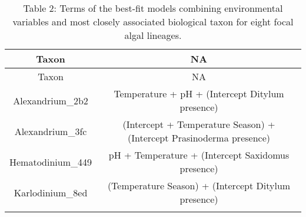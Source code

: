 \documentclass[
]{article}
\begin{document}
\begin{longtable}[]{@{}cc@{}}
\caption{Table 2: Terms of the best-fit models combining environmental
variables and most closely associated biological taxon for eight focal
algal lineages. \normalsize}\tabularnewline
\toprule
\begin{minipage}[b]{0.29\columnwidth}\centering
Taxon\strut
\end{minipage} & \begin{minipage}[b]{0.43\columnwidth}\centering
NA\strut
\end{minipage}\tabularnewline
\midrule
\endfirsthead
\toprule
\begin{minipage}[b]{0.29\columnwidth}\centering
Taxon\strut
\end{minipage} & \begin{minipage}[b]{0.43\columnwidth}\centering
NA\strut
\end{minipage}\tabularnewline
\midrule
\endhead
\begin{minipage}[t]{0.29\columnwidth}\centering
Alexandrium\_2b2\strut
\end{minipage} & \begin{minipage}[t]{0.43\columnwidth}\centering
Temperature + pH + (Intercept \textbar{} Ditylum presence)\strut
\end{minipage}\tabularnewline
\begin{minipage}[t]{0.29\columnwidth}\centering
Alexandrium\_3fc\strut
\end{minipage} & \begin{minipage}[t]{0.43\columnwidth}\centering
(Intercept + Temperature \textbar{} Season) + (Intercept \textbar{}
Prasinoderma presence)\strut
\end{minipage}\tabularnewline
\begin{minipage}[t]{0.29\columnwidth}\centering
Hematodinium\_449\strut
\end{minipage} & \begin{minipage}[t]{0.43\columnwidth}\centering
pH + Temperature + (Intercept \textbar{} Saxidomus presence)\strut
\end{minipage}\tabularnewline
\begin{minipage}[t]{0.29\columnwidth}\centering
Karlodinium\_8ed\strut
\end{minipage} & \begin{minipage}[t]{0.43\columnwidth}\centering
(Temperature \textbar{} Season) + (Intercept \textbar{} Ditylum
presence)\strut
\end{minipage}\tabularnewline
\begin{minipage}[t]{0.29\columnwidth}\centering

\end{minipage}
\end{longtable}
\end{document}
